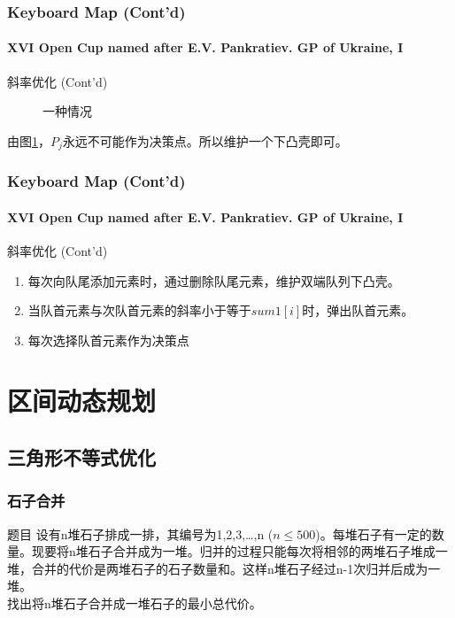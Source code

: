 \documentclass[hyperref={unicode=true}]{beamer}
\theoremstyle{definition}
\theoremstyle{proof}
\begin{document}
\begin{frame}\frametitle{Keyboard Map (Cont'd)}
  \framesubtitle{XVI Open Cup named after E.V. Pankratiev. GP of Ukraine, I}
  \begin{exampleblock}{斜率优化 (Cont'd)}
    \begin{figure}
      \caption{一种情况}\label{fig:line2}
    \end{figure}
    由图\ref{fig:line2}，$P_j$永远不可能作为决策点。所以维护一个下凸壳即可。
  \end{exampleblock}
\end{frame}
\begin{frame}\frametitle{Keyboard Map (Cont'd)}
  \framesubtitle{XVI Open Cup named after E.V. Pankratiev. GP of Ukraine, I}
  \begin{exampleblock}{斜率优化 (Cont'd)}
    \begin{enumerate}
    \item 每次向队尾添加元素时，通过删除队尾元素，维护双端队列下凸壳。
    \item 当队首元素与次队首元素的斜率小于等于$sum1[i]$时，弹出队首元素。
    \item 每次选择队首元素作为决策点
    \end{enumerate}
  \end{exampleblock}
\end{frame}

\section{区间动态规划}
\subsection{三角形不等式优化}
\begin{frame}\frametitle{石子合并}
  \begin{block}{题目}
    设有n堆石子排成一排，其编号为1,2,3,…,n ($n\leq500$)。每堆石子有一定的数量。现要将n堆石子合并成为一堆。归并的过程只能每次将相邻的两堆石子堆成一堆，合并的代价是两堆石子的石子数量和。这样n堆石子经过n-1次归并后成为一堆。\\
    找出将n堆石子合并成一堆石子的最小总代价。
  \end{block}
\end{frame}
\end{document}
